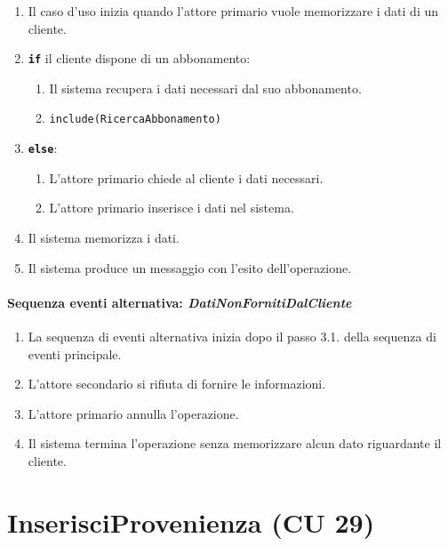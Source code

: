 \documentclass{article}
\begin{document}
	\begin{enumerate}[itemsep=8pt,parsep=0pt]
	    \item Il caso d'uso inizia quando l'attore primario vuole memorizzare i dati di un cliente. 
	    \item \texttt{\textbf{if}} il cliente dispone di un abbonamento:
			\begin{enumerate}	[leftmargin=28pt]
			\item Il sistema recupera i dati necessari dal suo abbonamento. %
			\item \texttt{{include(RicercaAbbonamento)}}
  			\end{enumerate}
  		\item \texttt{\textbf{else}}:
  		\begin{enumerate}	[leftmargin=28pt]
	        \item L'attore primario chiede al cliente i dati necessari.
	        \item L'attore primario inserisce i dati nel sistema.
	    \end{enumerate}
		\item Il sistema memorizza i dati.
		\item Il sistema produce un messaggio con l'esito dell'operazione.
	
	\end{enumerate}
	
	\paragraph{Sequenza eventi alternativa: \emph{DatiNonFornitiDalCliente}}
		\begin{enumerate}[itemsep=8pt,parsep=0pt]
				\item La sequenza di eventi alternativa inizia dopo il passo 3.1. della sequenza di eventi principale.
				\item L'attore secondario si rifiuta di fornire le informazioni.
				\item L'attore primario annulla l'operazione.
				\item Il sistema termina l'operazione senza memorizzare alcun dato riguardante il cliente.
		\end{enumerate}





	
	
\newpage	
\section*{InserisciProvenienza (CU 29)}
	
\end{document}
